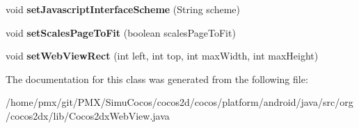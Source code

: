 \begin{DoxyCompactItemize}
void {\bfseries set\+Javascript\+Interface\+Scheme} (String scheme)
\item 
\mbox{\label{classorg_1_1cocos2dx_1_1lib_1_1Cocos2dxWebView_acd4488080324d243a15619f4ca99d225}} 
void {\bfseries set\+Scales\+Page\+To\+Fit} (boolean scales\+Page\+To\+Fit)
\item 
\mbox{\label{classorg_1_1cocos2dx_1_1lib_1_1Cocos2dxWebView_a395d5f7926bf28b5e34b440e00870c65}} 
void {\bfseries set\+Web\+View\+Rect} (int left, int top, int max\+Width, int max\+Height)
\end{DoxyCompactItemize}


The documentation for this class was generated from the following file\+:\begin{DoxyCompactItemize}
\item 
/home/pmx/git/\+P\+M\+X/\+Simu\+Cocos/cocos2d/cocos/platform/android/java/src/org/cocos2dx/lib/Cocos2dx\+Web\+View.\+java\end{DoxyCompactItemize}
